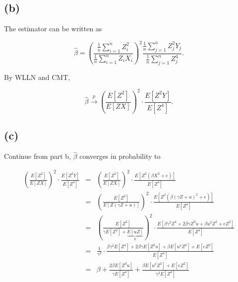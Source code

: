 \documentclass{article}
\begin{document}
\subsection*{(b)}

The estimator can be written as

\begin{equation*}
\hat{\beta}=\left( \frac{\frac{1}{n}\sum_{i=1}^{n}Z_{i}^{2}}{\frac{1}{n}%
\sum_{i=1}^{n}Z_{i}X_{i}}\right) ^{2}\frac{\frac{1}{n}%
\sum_{j=1}^{n}Z_{j}^{2}Y_{j}}{\frac{1}{n}\sum_{j=1}^{n}Z_{j}^{4}}.
\end{equation*}

By WLLN and CMT,

\begin{equation*}
\hat{\beta}\overset{p}{\longrightarrow }\left( \frac{E\left[ Z^{2}\right] }{E%
\left[ ZX\right] }\right) ^{2}\cdot \frac{E\left[ Z^{2}Y\right] }{E\left[
Z^{4}\right] }.
\end{equation*}

\subsection*{(c)}

Continue from part b, $\hat{\beta}$ converges in probability to

\begin{eqnarray*}
\left( \frac{E\left[ Z^{2}\right] }{E\left[ ZX\right] }\right) ^{2}\cdot 
\frac{E\left[ Z^{2}Y\right] }{E\left[ Z^{4}\right] } &=&\left( \frac{E\left[
Z^{2}\right] }{E\left[ ZX\right] }\right) ^{2}\cdot \frac{E\left[
Z^{2}\left( \beta X^{2}+e\right) \right] }{E\left[ Z^{4}\right] } \\
&=&\left( \frac{E\left[ Z^{2}\right] }{E\left[ Z\left( \gamma Z+u\right) %
\right] }\right) ^{2}\cdot \frac{E\left[ Z^{2}\left( \beta \left( \gamma
Z+u\right) ^{2}+e\right) \right] }{E\left[ Z^{4}\right] } \\
&=&\left( \frac{E\left[ Z^{2}\right] }{\gamma E\left[ Z^{2}\right] +\underset%
{0}{\underbrace{E\left[ uZ\right] }}}\right) ^{2}\cdot \frac{E\left[ \beta
\gamma ^{2}Z^{4}+2\beta \gamma Z^{3}u+\beta u^{2}Z^{2}+eZ^{2}\right] }{E%
\left[ Z^{4}\right] } \\
&=&\frac{1}{\gamma ^{2}}\cdot \frac{\beta \gamma ^{2}E\left[ Z^{4}\right]
+2\beta \gamma E\left[ Z^{3}u\right] +\beta E\left[ u^{2}Z^{2}\right] +E%
\left[ eZ^{2}\right] }{E\left[ Z^{4}\right] } \\
&=&\beta +\frac{2\beta E\left[ Z^{3}u\right] }{\gamma E\left[ Z^{4}\right] }+%
\frac{\beta E\left[ u^{2}Z^{2}\right] +E\left[ eZ^{2}\right] }{\gamma ^{2}E%
\left[ Z^{4}\right] }
\end{eqnarray*}
\end{document}
